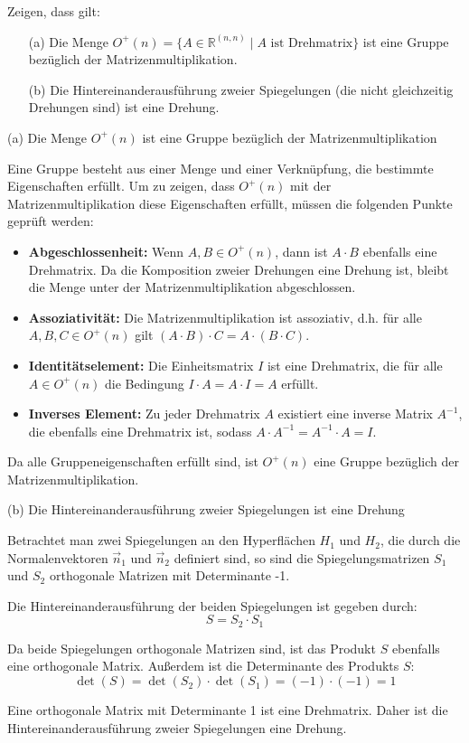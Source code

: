 
Zeigen, dass gilt:

\begin{enumerate}
    \item[(a)] Die Menge \( O^+(n) = \{ A \in \mathbb{R}^{(n,n)} \mid A \text{ ist Drehmatrix} \} \) ist eine Gruppe bezüglich der Matrizenmultiplikation.
    \item[(b)] Die Hintereinanderausführung zweier Spiegelungen (die nicht gleichzeitig Drehungen sind) ist eine Drehung.
\end{enumerate}

(a) Die Menge \( O^+(n) \) ist eine Gruppe bezüglich der Matrizenmultiplikation

Eine Gruppe besteht aus einer Menge und einer Verknüpfung, die bestimmte Eigenschaften erfüllt. Um zu zeigen, dass \( O^+(n) \) mit der Matrizenmultiplikation diese Eigenschaften erfüllt, müssen die folgenden Punkte geprüft werden:

\begin{itemize}
    \item \textbf{Abgeschlossenheit:} Wenn \( A, B \in O^+(n) \), dann ist \( A \cdot B \) ebenfalls eine Drehmatrix. Da die Komposition zweier Drehungen eine Drehung ist, bleibt die Menge unter der Matrizenmultiplikation abgeschlossen.
    \item \textbf{Assoziativität:} Die Matrizenmultiplikation ist assoziativ, d.h. für alle \( A, B, C \in O^+(n) \) gilt \( (A \cdot B) \cdot C = A \cdot (B \cdot C) \).
    \item \textbf{Identitätselement:} Die Einheitsmatrix \( I \) ist eine Drehmatrix, die für alle \( A \in O^+(n) \) die Bedingung \( I \cdot A = A \cdot I = A \) erfüllt.
    \item \textbf{Inverses Element:} Zu jeder Drehmatrix \( A \) existiert eine inverse Matrix \( A^{-1} \), die ebenfalls eine Drehmatrix ist, sodass \( A \cdot A^{-1} = A^{-1} \cdot A = I \).
\end{itemize}

Da alle Gruppeneigenschaften erfüllt sind, ist \( O^+(n) \) eine Gruppe bezüglich der Matrizenmultiplikation.

(b) Die Hintereinanderausführung zweier Spiegelungen ist eine Drehung

Betrachtet man zwei Spiegelungen an den Hyperflächen \( H_1 \) und \( H_2 \), die durch die Normalenvektoren \( \vec{n}_1 \) und \( \vec{n}_2 \) definiert sind, so sind die Spiegelungsmatrizen \( S_1 \) und \( S_2 \) orthogonale Matrizen mit Determinante -1.

Die Hintereinanderausführung der beiden Spiegelungen ist gegeben durch:
\[
S = S_2 \cdot S_1
\]

Da beide Spiegelungen orthogonale Matrizen sind, ist das Produkt \( S \) ebenfalls eine orthogonale Matrix. Außerdem ist die Determinante des Produkts \( S \):
\[
\det(S) = \det(S_2) \cdot \det(S_1) = (-1) \cdot (-1) = 1
\]

Eine orthogonale Matrix mit Determinante 1 ist eine Drehmatrix. Daher ist die Hintereinanderausführung zweier Spiegelungen eine Drehung.
